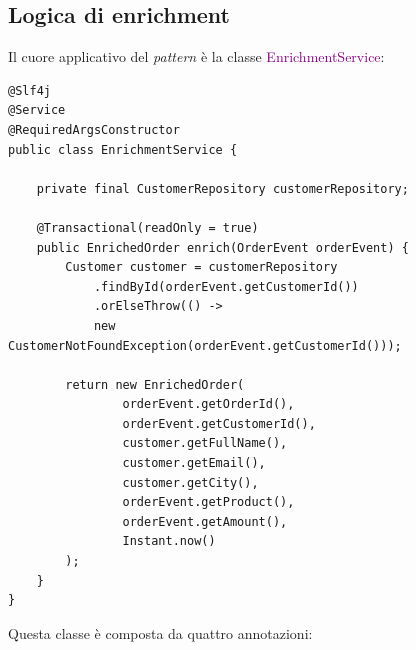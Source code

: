 \subsection{Logica di enrichment}
\label{Logica di enrichment}
Il cuore applicativo del \textit{pattern}  è la classe \textcolor{purple}{EnrichmentService}:
\begin{codelisting}[H]
\begin{verbatim}
@Slf4j
@Service
@RequiredArgsConstructor
public class EnrichmentService {

    private final CustomerRepository customerRepository;

    @Transactional(readOnly = true)
    public EnrichedOrder enrich(OrderEvent orderEvent) {
        Customer customer = customerRepository
            .findById(orderEvent.getCustomerId())
            .orElseThrow(() -> 
            new CustomerNotFoundException(orderEvent.getCustomerId()));

        return new EnrichedOrder(
                orderEvent.getOrderId(),
                orderEvent.getCustomerId(),
                customer.getFullName(),
                customer.getEmail(),
                customer.getCity(),
                orderEvent.getProduct(),
                orderEvent.getAmount(),
                Instant.now()
        );
    }
}
\end{verbatim}
\caption{EnrichmentService}
\end{codelisting}
\noindent
Questa classe è composta da quattro annotazioni:
